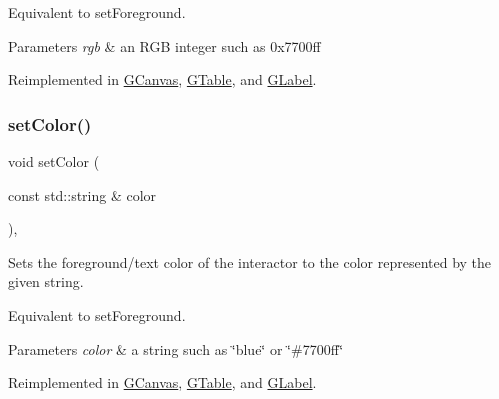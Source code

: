 Equivalent to set\+Foreground. 
\begin{DoxyParams}{Parameters}
{\em rgb} & an R\+GB integer such as 0x7700ff \\
\hline
\end{DoxyParams}


Reimplemented in \mbox{\hyperlink{classsgl_1_1GCanvas_af6e1bcf23a09a0ae0607daff81ee45fa}{G\+Canvas}}, \mbox{\hyperlink{classsgl_1_1GTable_a165735fb49fa7db12602d32557cbfe0d}{G\+Table}}, and \mbox{\hyperlink{classsgl_1_1GLabel_a165735fb49fa7db12602d32557cbfe0d}{G\+Label}}.

\mbox{\label{classsgl_1_1GInteractor_a61374df6c11b52cfbb0815decdbaebc6}} 
\subsubsection{\texorpdfstring{set\+Color()}{setColor()}\hspace{0.1cm}{\footnotesize\ttfamily [2/2]}}
{\footnotesize\ttfamily void set\+Color (\begin{DoxyParamCaption}\item[{const std\+::string \&}]{color }\end{DoxyParamCaption})\hspace{0.3cm}{\ttfamily [virtual]}, {\ttfamily [inherited]}}



Sets the foreground/text color of the interactor to the color represented by the given string. 

Equivalent to set\+Foreground. 
\begin{DoxyParams}{Parameters}
{\em color} & a string such as \char`\"{}blue\char`\"{} or \char`\"{}\#7700ff\char`\"{} \\
\hline
\end{DoxyParams}


Reimplemented in \mbox{\hyperlink{classsgl_1_1GCanvas_a56845b1accc47aa881d05939eef6996c}{G\+Canvas}}, \mbox{\hyperlink{classsgl_1_1GTable_a56845b1accc47aa881d05939eef6996c}{G\+Table}}, and \mbox{\hyperlink{classsgl_1_1GLabel_a56845b1accc47aa881d05939eef6996c}{G\+Label}}.

\mbox{\label{classsgl_1_1GInteractor_ac29f9a3462458e165fae3a1f046ee77a}} 
